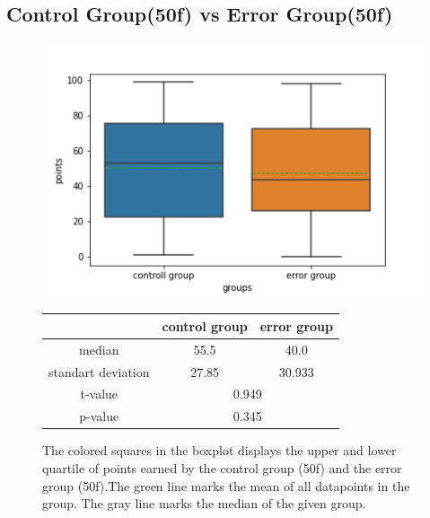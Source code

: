 \documentclass[runningheads]{llncs}
\begin{document}
\subsection{Control Group(50f) vs Error Group(50f)}
\begin{figure}[!h]
    \begin{minipage}{0.43\textwidth}        
        \includegraphics[width=\textwidth]{code/generate/all.png}
        \caption{The colored squares in the boxplot displays
        the upper and lower quartile of points earned by the control group (50f) and
        the error group (50f).The green line marks the mean of all datapoints in the group.
        The gray line marks the median  of the given group.} \label{fig3}
    \end{minipage}
\hfill
\begin{minipage}{0.43\textwidth}
\begin{tabular}[]{| c | c | c |}
        \hline
        & control group & error group \\
        \hline
        median & 55.5&40.0 \\
        \hline
        standart deviation & 27.85&30.933 \\
        \hline
        t-value & \multicolumn{2}{c|}{0.949} \\
        \hline
        p-value & \multicolumn{2}{c|}{0.345} \\
        \hline            
\end{tabular}
\end{minipage}
\end{figure}
\end{document}
